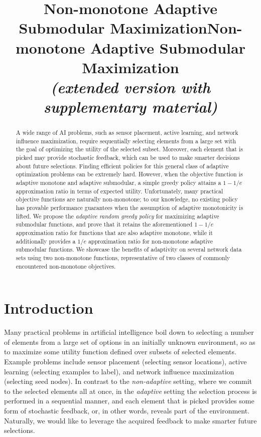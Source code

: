 \documentclass{article}
\title{Non-monotone Adaptive Submodular Maximization}
\title{Non-monotone Adaptive Submodular Maximization\\\emph{\footnotesize (extended version with supplementary material)}}
\begin{document}
\maketitle

\begin{abstract}
A wide range of AI problems, such as sensor placement, active learning, and network influence maximization, require sequentially selecting elements from a large set with the goal of optimizing the utility of the selected subset.
Moreover, each element that is picked may provide stochastic feedback, which can be used to make smarter decisions about future selections.
Finding efficient policies for this general class of adaptive optimization problems can be extremely hard.
However, when the objective function is adaptive monotone and adaptive submodular, a simple greedy policy attains a $1-1/e$ approximation ratio in terms of expected utility.
Unfortunately, many practical objective functions are naturally non-monotone; to our knowledge, no existing policy has provable performance guarantees when the assumption of adaptive monotonicity is lifted.
We propose the \emph{adaptive random greedy policy} for maximizing adaptive submodular functions, and prove that it retains the aforementioned $1-1/e$ approximation ratio for functions that are also adaptive monotone, while it additionally provides a $1/e$ approximation ratio for non-monotone adaptive submodular functions.
We showcase the benefits of adaptivity on several network data sets using two non-monotone functions, representative of two classes of commonly encountered non-monotone objectives.
\end{abstract}

\section{Introduction}

Many practical problems in artificial intelligence boil down to selecting a number of elements from a large set of options in an initially unknown environment, so as to maximize some utility function defined over subsets of selected elements.
Example problems include sensor placement (selecting sensor locations), active learning (selecting examples to label), and network influence maximization (selecting seed nodes).
In contrast to the \emph{non-adaptive} setting, where we commit to the selected elements all at once, in the \emph{adaptive} setting the selection process is performed in a sequential manner, and each element that is picked provides some form of stochastic feedback, or, in other words, reveals part of the environment.
Naturally, we would like to leverage the acquired feedback to make smarter future selections.
\end{document}
